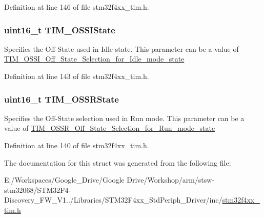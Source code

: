 Definition at line 146 of file stm32f4xx\-\_\-tim.\-h.

\hypertarget{struct_t_i_m___b_d_t_r_init_type_def_afc160a2e65a93ea65c81bf05aa6f085d}{
\subsubsection[{T\-I\-M\-\_\-\-O\-S\-S\-I\-State}]{\setlength{\rightskip}{0pt plus 5cm}uint16\-\_\-t T\-I\-M\-\_\-\-O\-S\-S\-I\-State}}\label{struct_t_i_m___b_d_t_r_init_type_def_afc160a2e65a93ea65c81bf05aa6f085d}
Specifies the Off-\/\-State used in Idle state. This parameter can be a value of \hyperlink{group___t_i_m___o_s_s_i___off___state___selection__for___idle__mode__state}{T\-I\-M\-\_\-\-O\-S\-S\-I\-\_\-\-Off\-\_\-\-State\-\_\-\-Selection\-\_\-for\-\_\-\-Idle\-\_\-mode\-\_\-state} 

Definition at line 143 of file stm32f4xx\-\_\-tim.\-h.

\hypertarget{struct_t_i_m___b_d_t_r_init_type_def_a5d0ca05d766b82cde0a56a6b61c02f8b}{
\subsubsection[{T\-I\-M\-\_\-\-O\-S\-S\-R\-State}]{\setlength{\rightskip}{0pt plus 5cm}uint16\-\_\-t T\-I\-M\-\_\-\-O\-S\-S\-R\-State}}\label{struct_t_i_m___b_d_t_r_init_type_def_a5d0ca05d766b82cde0a56a6b61c02f8b}
Specifies the Off-\/\-State selection used in Run mode. This parameter can be a value of \hyperlink{group___t_i_m___o_s_s_r___off___state___selection__for___run__mode__state}{T\-I\-M\-\_\-\-O\-S\-S\-R\-\_\-\-Off\-\_\-\-State\-\_\-\-Selection\-\_\-for\-\_\-\-Run\-\_\-mode\-\_\-state} 

Definition at line 140 of file stm32f4xx\-\_\-tim.\-h.



The documentation for this struct was generated from the following file\-:\begin{DoxyCompactItemize}
\item 
E\-:/\-Workspaces/\-Google\-\_\-\-Drive/\-Google Drive/\-Workshop/arm/stsw-\/stm32068/\-S\-T\-M32\-F4-\/\-Discovery\-\_\-\-F\-W\-\_\-\-V1../\-Libraries/\-S\-T\-M32\-F4xx\-\_\-\-Std\-Periph\-\_\-\-Driver/inc/\hyperlink{stm32f4xx__tim_8h}{stm32f4xx\-\_\-tim.\-h}\end{DoxyCompactItemize}
